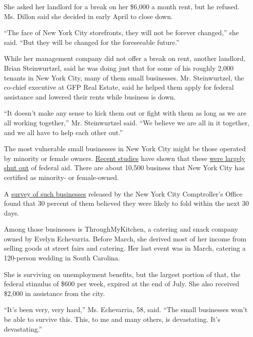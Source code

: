 She asked her landlord for a break on her \$6,000 a month rent, but he
refused. Ms. Dillon said she decided in early April to close down.

``The face of New York City storefronts, they will not be forever
changed,'' she said. ``But they will be changed for the foreseeable
future.''

While her management company did not offer a break on rent, another
landlord, Brian Steinwurtzel, said he was doing just that for some of
his roughly 2,000 tenants in New York City, many of them small
businesses. Mr. Steinwurtzel, the co-chief executive at GFP Real Estate,
said he helped them apply for federal assistance and lowered their rents
while business is down.

``It doesn't make any sense to kick them out or fight with them as long
as we are all working together,'' Mr. Steinwurtzel said. ``We believe we
are all in it together, and we all have to help each other out.''

The most vulnerable small businesses in New York City might be those
operated by minority or female owners.
\href{https://www.nytimes3xbfgragh.onion/2020/05/18/business/minority-businesses-coronavirus-loans.html}{Recent
studies} have shown that these
\href{https://www.nytimes3xbfgragh.onion/2020/04/10/business/minority-business-coronavirus-loans.html}{were
largely shut out} of federal aid. There are about 10,500 business that
New York City has certified as minority- or female-owned.

A
\href{https://comptroller.nyc.gov/newsroom/comptroller-stringer-analysis-85-percent-of-m-wbes-report-they-will-be-out-of-business-in-six-months-due-to-economic-distress-of-covid-19-pandemic/}{survey
of such businesses} released by the New York City Comptroller's Office
found that 30 percent of them believed they were likely to fold within
the next 30 days.

Among those businesses is ThroughMyKitchen, a catering and snack company
owned by Evelyn Echevarria. Before March, she derived most of her income
from selling goods at street fairs and catering. Her last event was in
March, catering a 120-person wedding in South Carolina.

She is surviving on unemployment benefits, but the largest portion of
that, the federal stimulus of \$600 per week, expired at the end of
July. She also received \$2,000 in assistance from the city.

``It's been very, very hard,'' Ms. Echevarria, 58, said. ``The small
businesses won't be able to survive this. This, to me and many others,
is devastating. It's devastating.''

